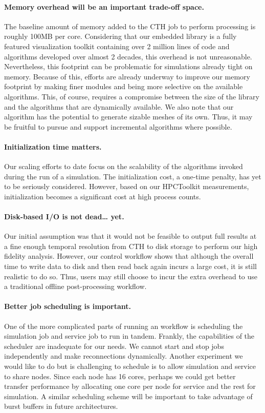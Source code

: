 \paragraph{Memory overhead will be an important trade-off space.}
The baseline amount of memory added to the CTH job to perform \insitu
processing is roughly 100MB per core.  Considering that our embedded
\insitu library is a fully featured visualization toolkit containing over 2
million lines of code and algorithms developed over almost 2 decades, this
overhead is not unreasonable.  Nevertheless, this footprint can be
problematic for simulations already tight on memory.  Because of this,
efforts are already underway to improve our memory footprint by making
finer modules and being more selective on the available algorithms.  This,
of course, requires a compromise between the size of the library and the
algorithms that are dynamically available.  We also note that our algorithm
has the potential to generate sizable meshes of its own.  Thus, it may be
fruitful to pursue and support incremental algorithms where possible.

\paragraph{Initialization time matters.}  Our scaling efforts to date
focus on the scalability of the algorithms invoked during the run of a
simulation.  The initialization cost, a one-time penalty, has yet to be
seriously considered.  However, based on our HPCToolkit measurements,
initialization becomes a significant cost at high process counts.

\paragraph{Disk-based I/O is not dead\ldots{} yet.} Our initial assumption
was that it would not be feasible to output full results at a fine enough
temporal resolution from CTH to disk storage to perform our high fidelity
analysis.  However, our control workflow shows that although the overall
time to write data to disk and then read back again incurs a large cost, it
is still realistic to do so.  Thus, users may still choose to incur the
extra overhead to use a traditional offline post-processing \vda workflow.

\paragraph{Better job scheduling is important.} One of the more complicated
parts of running an \intransit workflow is scheduling the simulation job
and service job to run in tandem.  Frankly, the capabilities of the
scheduler are inadequate for our needs.  We cannot start and stop jobs
independently and make reconnections dynamically.  Another experiment we
would like to do but is challenging to schedule is to allow simulation and
service to share nodes.  Since each node has 16 cores, perhaps we could get
better transfer performance by allocating one core per node for service and
the rest for simulation.  A similar scheduling scheme will be important to
take advantage of burst buffers in future architectures.

